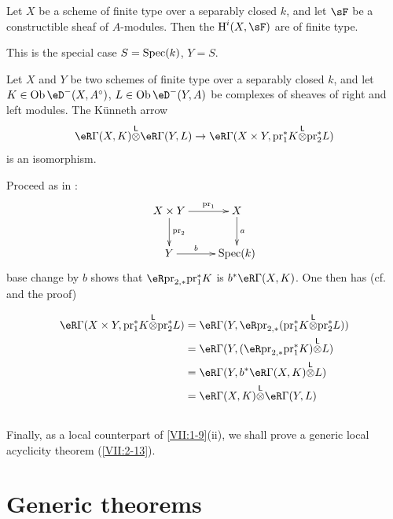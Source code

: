 \begin{corollary_}\label{VII:1-10}
Let $X$ be a scheme of finite type over a separably closed $k$, and let
$\sF$ be a constructible sheaf of $A$-modules. Then the $\h^i(X,\sF)$ are of
finite type.
\end{corollary_}

This is the special case $S=\operatorname{Spec}(k)$, $Y=S$.

\begin{corollary_}\label{VII:1-11}
Let $X$ and $Y$ be two schemes of finite type over a separably closed $k$,
and let $K\in \ob\eD^-(X,A^\circ)$,
$L\in \ob\eD^-(Y,A)$ be complexes of sheaves of right and left modules. The
K\"unneth arrow
\[
  \eR \Gamma(X,K) \lotimes \eR \Gamma(Y,L) \to \eR\Gamma(X\times Y,\pr_1^\ast K \lotimes \pr_2^\ast L)
\]
is an isomorphism.
\end{corollary_}

Proceed as in \cite[XVII 5.4.3]{sga4}:
\[\xymatrix{
  X\times Y \ar[r]^-{\text{pr}_1} \ar[d]^-{\text{pr}_2}
    & X \ar[d]^-a \\
  Y \ar[r]^-b
    & \spec(k)
}\]
base change by $b$ shows that $\eR\pr_{2,\ast}{} \pr_1^\ast K$ is
$b^\ast \eR\Gamma(X,K)$. One then has (cf.
\cite[XVII 5.2.11]{sga4} and the proof)

\begin{align*}
  \eR\Gamma(X\times Y,\pr_1^\ast K\lotimes \pr_2^\ast L)
    &= \eR\Gamma(Y,\eR \pr_{2,\ast}(\pr_1^\ast K\lotimes \pr_2^\ast L)) \\
    &= \eR\Gamma(Y,(\eR\pr_{2,\ast}\pr_1^\ast K)\lotimes L) \\
    &= \eR\Gamma(Y,b^\ast \eR\Gamma(X,K)\lotimes L) \\
    &= \eR\Gamma(X,K)\lotimes \eR\Gamma(Y,L)
\end{align*}






\subsection{}\label{VII:1-12}

Finally, as a local counterpart of \ref{VII:1-9}(ii), we shall prove a
generic local acyclicity theorem (\ref{VII:2-13}).











\section{Generic theorems}\label{VII:2}

